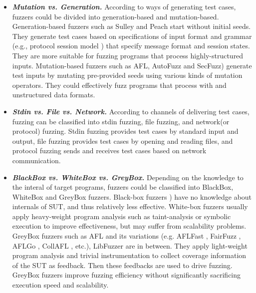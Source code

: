 \begin{itemize}
\item \textbf{\textit{Mutation vs. Generation.}} According to ways of generating test cases, fuzzers could be divided into generation-based and mutation-based. Generation-based fuzzers such as Sulley \cite{amini2013sulley} and Peach \cite{eddington2011peach} start without initial seeds. They generate test cases based on specifications of input format and grammar (e.g., protocol session model ) that specify message format and session states. They are more suitable for fuzzing programs that process highly-structured inputs. Mutation-based fuzzers such as AFL\cite{afl}, AutoFuzz \cite{gorbunov2010autofuzz} and SecFuzz\cite{tsankov2012secfuzz}) generate test inputs by mutating pre-provided seeds using various kinds of mutation operators. They could effectively fuzz programs that process with and unstructured data formats.
\item \textbf{\textit{Stdin vs. File vs. Network.}} According to channels of delivering test cases, fuzzing can be classified into stdin fuzzing, file fuzzing, and network(or protocol) fuzzing. Stdin fuzzing provides test cases by standard input and output, file fuzzing provides test cases by opening and reading files, and protocol fuzzing sends and receives test cases based on network communication. 
\item \textbf{\textit{BlackBox vs. WhiteBox vs. GreyBox.}} Depending on the knowledge to the interal of target programs, fuzzers could be classified into BlackBox, WhiteBox and GreyBox fuzzers. Black-box fuzzers \cite{ amini2013sulley} \cite{eddington2011peach} \cite{gascon2015pulsar}) have no knowledge about internals of SUT, and thus relatively less effective. White-box fuzzers usually apply heavy-weight program analysis such as taint-analysis \cite{ganesh2009taint-white} \cite{wang2010taintscope} or symbolic execution \cite{stephens2016driller}  \cite{godefroid2012sage} to improve effectiveness, but may suffer from scalability problems. GreyBox fuzzers such as AFL \cite{afl} and its variations (e.g. AFLFast \cite{bohme2016aflfast}, FairFuzz \cite{fairfuzz}, AFLGo \cite{bohme2017aflgo}, CollAFL \cite{gancollafl}, etc.), LibFuzzer \cite{infrastructure2017libfuzzer} are in between. They apply light-weight program analysis and trivial instrumentation to collect coverage information of the SUT as feedback. Then these feedbacks are used to drive fuzzing. GreyBox fuzzers improve fuzzing efficiency without significantly sacrificing execution speed and scalability.
\end{itemize}

